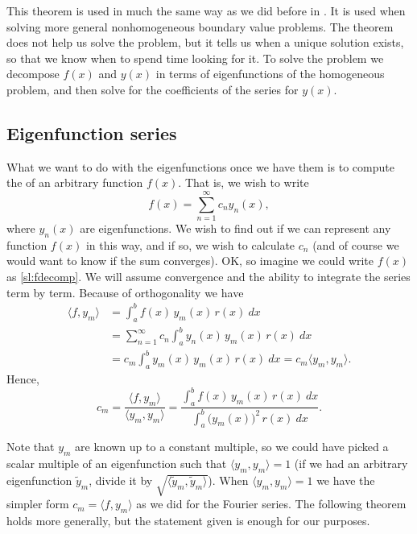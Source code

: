 \documentclass[12pt]{book}
\begin{document}
This theorem is used in much the same way as we did before in
.  It is used when solving more general nonhomogeneous
boundary value problems.  The theorem does not help us solve the problem, but
it tells us when a unique solution exists, so
that we know when to spend time looking for it.  To solve the problem
we decompose $f(x)$ and $y(x)$ in terms of eigenfunctions of the
homogeneous
problem, and then solve for the coefficients of the series for $y(x)$.

\subsection{Eigenfunction series}

What we want to do with the eigenfunctions once we have them is to
compute the \emph{} of an arbitrary
function $f(x)$.  That is, we wish to write
\begin{equation} \label{sl:fdecomp}
f(x) = \sum_{n=1}^\infty c_n y_n(x) ,
\end{equation}
where $y_n(x)$ are eigenfunctions.
We wish to find out if we can represent
any function $f(x)$ in this way,
and if so, we wish to calculate $c_n$ (and of course we would want to know if
the sum converges).  OK, so imagine
we could write $f(x)$ as \eqref{sl:fdecomp}.  We will assume convergence and
the ability to integrate the series term by term.
Because of orthogonality we have
\begin{equation*}
\begin{split}
\langle f , y_m \rangle & =
\int_a^b f(x) \, y_m (x) \, r(x) ~ dx\\
&= \sum_{n=1}^\infty c_n \int_a^b y_n(x) \, y_m (x) \, r(x) ~ dx\\
&= c_m \int_a^b y_m(x) \, y_m (x) \, r(x) ~ dx = c_m \langle y_m , y_m \rangle
.
\end{split}
\end{equation*}
Hence,
\begin{equation} \label{sl:cm}
\boxed{~~
c_m = \frac{\langle f , y_m \rangle}{\langle y_m , y_m \rangle}
=
\frac{\int_a^b f(x) \, y_m (x)\, r(x) ~ dx}%
{\int_a^b {\bigl(y_m(x)\bigr)}^2 \, r(x) ~dx} .
~~}
\end{equation}

Note that $y_m$ are known up to a constant multiple, so we could have picked
a scalar multiple of an eigenfunction such that
$\langle y_m , y_m \rangle = 1$ (if we had an arbitrary eigenfunction
$\tilde{y}_m$, divide it
by $\sqrt{\langle \tilde{y}_m , \tilde{y}_m \rangle}$).
When
$\langle y_m , y_m \rangle = 1$
we have the
simpler form $c_m = \langle f, y_m \rangle$ as we did for the
Fourier series.  The following theorem holds
more generally, but the statement given is enough for our purposes.
\end{document}
